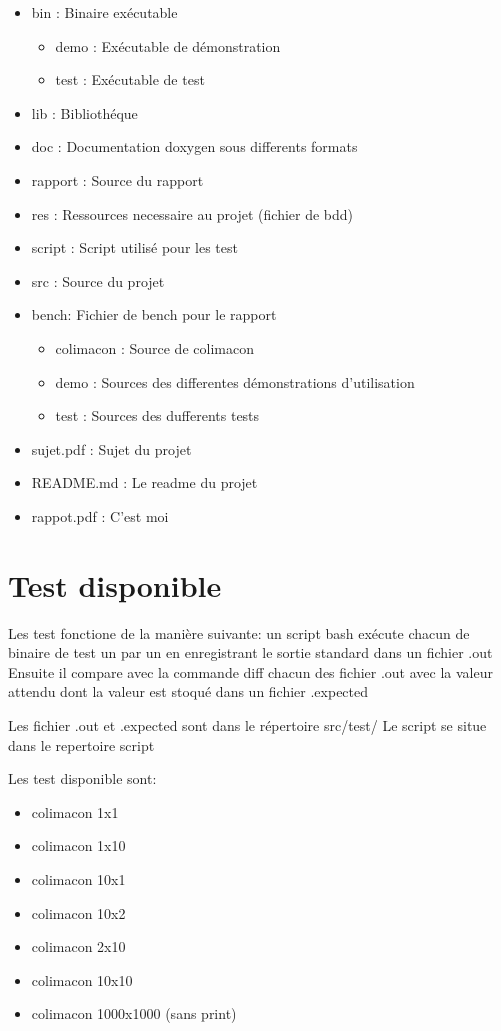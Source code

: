 \documentclass[a4paper]{article}
\begin{document}
\begin{itemize}
\item bin : Binaire exécutable
\begin{itemize}
  \item demo : Exécutable de démonstration
  \item test : Exécutable de test
\end{itemize}
\item lib : Bibliothéque
\item doc : Documentation doxygen sous differents formats
\item rapport : Source du rapport
\item res : Ressources necessaire au projet (fichier de bdd)
\item script  : Script utilisé pour les test
\item src : Source du projet
\item bench: Fichier de bench pour le rapport
\begin{itemize}
  \item colimacon : Source de colimacon
  \item demo  : Sources des differentes démonstrations d'utilisation
  \item test  : Sources des dufferents tests
\end{itemize}

\item sujet.pdf  : Sujet du projet
\item README.md  : Le readme du projet
\item rappot.pdf : C'est moi
\end{itemize}

\section{Test disponible}
Les test fonctione de la manière suivante: un script bash exécute chacun de binaire de
test un par un en enregistrant le sortie standard dans un fichier .out
Ensuite il compare avec la commande diff chacun des fichier .out avec la
valeur attendu dont la valeur est stoqué dans un fichier .expected

Les fichier .out et .expected sont dans le répertoire src/test/
Le script se situe dans le repertoire script

Les test disponible sont:
\begin{itemize}
  \item  colimacon 1x1
  \item  colimacon 1x10
  \item  colimacon 10x1
  \item  colimacon 10x2
  \item  colimacon 2x10
  \item  colimacon 10x10
  \item  colimacon 1000x1000 (sans print)
\end{itemize}
\end{document}
